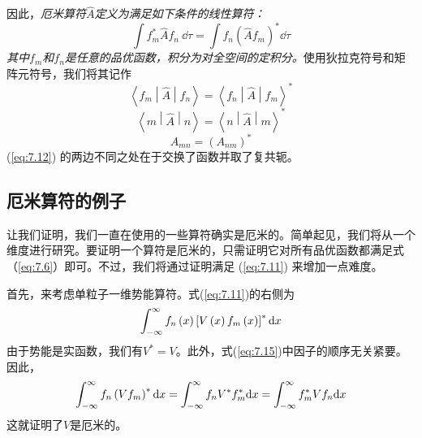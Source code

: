     因此，\textit{厄米算符$\hat{A}$定义为满足如下条件的线性算符：}
    \begin{equation}
        \boxed{
            \int f^{\ast}_m \hat{A} f_n \:\dd \tau = \int f_n \left(\hat{A} f_m\right)^{\ast} \dd \tau
        }
        \label{eq:7.11}
    \end{equation}
    \textit{其中$f_m$和$f_n$是任意的品优函数，积分为对全空间的定积分。}使用狄拉克符号和矩阵元符号，我们将其记作
    \begin{equation}
        \boxed{
            \left\langle f_m \middle| \hat{A} \middle| f_n \right\rangle = \left\langle f_n \middle| \hat{A} \middle| f_m \right\rangle^{\ast}
        }
        \label{eq:7.12}
    \end{equation}
    \begin{equation}
        \boxed{
            \left\langle m \middle| \hat{A} \middle| n \right\rangle = \left\langle n \middle| \hat{A} \middle| m \right\rangle^{\ast}
        }
        \label{eq:7.13}
    \end{equation}
    \begin{equation}
        \boxed{
            A_{mn} = \left(A_{nm}\right)^{\ast}
        }
        \label{eq:7.14}
    \end{equation}
    (\ref{eq:7.12}) 的两边不同之处在于交换了函数并取了复共轭。

\subsection*{厄米算符的例子}

    让我们证明，我们一直在使用的一些算符确实是厄米的。简单起见，我们将从一个维度进行研究。要证明一个算符是厄米的，只需证明它对所有品优函数都满足式（\ref{eq:7.6}）即可。不过，我们将通过证明满足 (\ref{eq:7.11}) 来增加一点难度。

    首先，来考虑单粒子一维势能算符。式(\ref{eq:7.11})的右侧为
    \begin{equation}
        \int_{-\infty}^{\infty}  f_n\left(x\right)\left[V\left(x\right)f_m\left(x\right)\right]^{\ast} \dd x
        \label{eq:7.15}
    \end{equation}
    由于势能是实函数，我们有$V^{\ast} = V$。此外，式(\ref{eq:7.15})中因子的顺序无关紧要。因此，
    \begin{equation*}
        \int_{-\infty}^{\infty}  f_n\left(Vf_m\right)^{\ast} \dd x = \int_{-\infty}^{\infty}  f_n V^{\ast} f^{\ast}_m \dd x = \int_{-\infty}^{\infty}  f_m^{\ast} V f_n \dd x
    \end{equation*}
    这就证明了$V$是厄米的。

